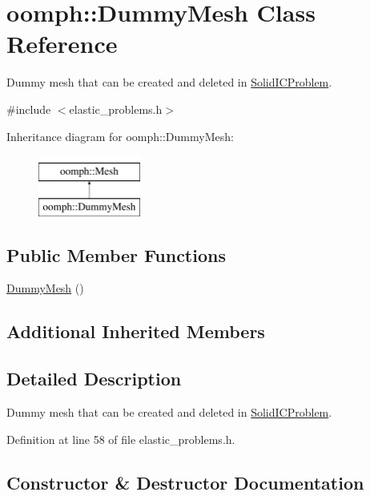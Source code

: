 \hypertarget{classoomph_1_1DummyMesh}{}\section{oomph\+:\+:Dummy\+Mesh Class Reference}
\label{classoomph_1_1DummyMesh}


Dummy mesh that can be created and deleted in \hyperlink{classoomph_1_1SolidICProblem}{Solid\+I\+C\+Problem}.  




{\ttfamily \#include $<$elastic\+\_\+problems.\+h$>$}

Inheritance diagram for oomph\+:\+:Dummy\+Mesh\+:\begin{figure}[H]
\begin{center}
\leavevmode
\includegraphics[height=2.000000cm]{classoomph_1_1DummyMesh}
\end{center}
\end{figure}
\subsection*{Public Member Functions}
\begin{DoxyCompactItemize}
\item 
\hyperlink{classoomph_1_1DummyMesh_aff05c7832ccd14b608557f5625aa015e}{Dummy\+Mesh} ()
\end{DoxyCompactItemize}
\subsection*{Additional Inherited Members}


\subsection{Detailed Description}
Dummy mesh that can be created and deleted in \hyperlink{classoomph_1_1SolidICProblem}{Solid\+I\+C\+Problem}. 

Definition at line 58 of file elastic\+\_\+problems.\+h.



\subsection{Constructor \& Destructor Documentation}
\mbox{\label{classoomph_1_1DummyMesh_aff05c7832ccd14b608557f5625aa015e}} 
